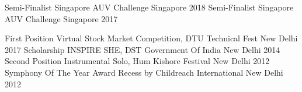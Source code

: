 \begin{cvhonors}
  \cvhonor
    {Semi-Finalist}
    {Singapore AUV Challenge}
    {Singapore}
    {2018}
  \cvhonor
    {Semi-Finalist}
    {Singapore AUV Challenge}
    {Singapore}
    {2017}
\end{cvhonors}

\begin{cvhonors}
  \cvhonor
  {First Position}
  {Virtual Stock Market Competition, DTU Technical Fest}
  {New Delhi}
  {2017}
  \cvhonor
    {Scholarship}
    {INSPIRE SHE, DST Government Of India}
    {New Delhi}
    {2014}
  \cvhonor
  {Second Position}
  {Instrumental Solo, Hum Kishore Festival}
  {New Delhi}
  {2012}
  \cvhonor
  {Symphony Of The Year Award}
  {Recess by Childreach International}
  {New Delhi}
  {2012}
\end{cvhonors}
